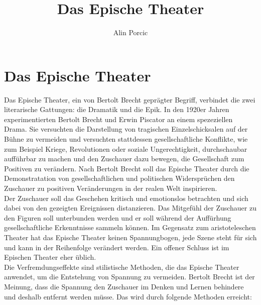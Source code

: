 \documentclass[a4paper]{article}
\title{Das Epische Theater}
\author{Alin Porcic}
\begin{document}
	\maketitle

	\newpage

	\section{Das Epische Theater}

        Das Epische Theater, ein von Bertolt Brecht geprägter Begriff, verbindet die zwei literarische Gattungen: die Dramatik und die Epik. In den 1920er Jahren experimentierten Bertolt Brecht und Erwin Piscator an einem spezeziellen  Drama. Sie versuchten die Darstellung von tragischen Einzelschicksalen auf der Bühne zu vermeiden und versuchten stattdessen gesellschaftliche Konflikte, wie zum Beispiel Kriege, Revolutionen oder soziale Ungerechtigkeit, durchschaubar aufführbar zu machen und den Zuschauer dazu bewegen, die Gesellschaft zum Positiven zu verändern. Nach Bertolt Brecht soll das Epische Theater durch die Demonstratation von gesellschaftlichen und politischen Widersprüchen den Zuschauer zu positiven Veränderungen in der realen Welt inspirieren.\\
        
        Der Zuschauer soll das Geschehen kritisch und emotionslos betrachten und sich dabei von den gezeigten Ereignissen distanzieren. Das Mitgefühl der Zuschauer zu den Figuren soll unterbunden werden und er soll während der Auffürhung gesellschaftliche Erkenntnisse sammeln können. Im Gegensatz zum aristoteleschen Theater hat das Epische Theater keinen Spannungbogen, jede Szene steht für sich und kann in der Reihenfolge verändert werden. Ein offener Schluss ist im Epischen Theater eher üblich.\\
        
        Die Verfremdungseffekte sind stilistische Methoden, die das Epische Theater anwendet, um die Entstehung von Spannung zu vermeiden. Bertolt Brecht ist der Meinung, dass die Spannung den Zuschauer im Denken und Lernen behindere und deshalb entfernt werden müsse. Das wird durch folgende Methoden erreicht:
        
\end{document}
